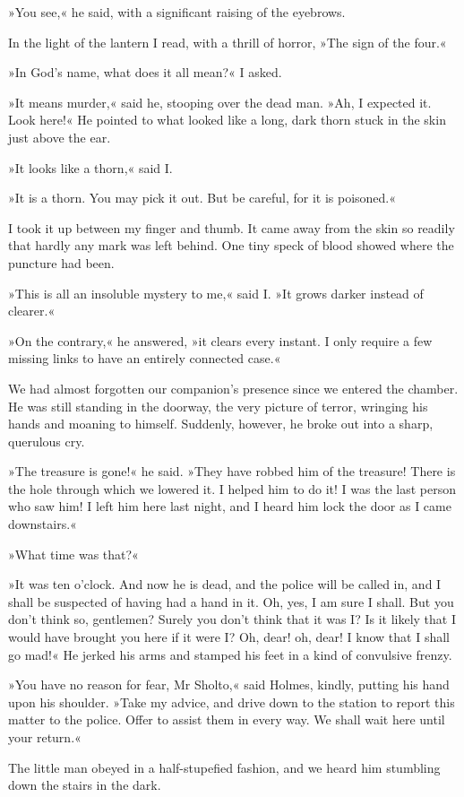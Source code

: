 »You see,« he said, with a significant raising of the eyebrows.

In the light of the lantern I read, with a thrill of horror, »The sign of the four.«

»In God's name, what does it all mean?« I asked.

»It means murder,« said he, stooping over the dead man. »Ah, I expected it. Look here!« He pointed to what looked like a long, dark thorn stuck in the skin just above the ear.

»It looks like a thorn,« said I.

»It is a thorn. You may pick it out. But be careful, for it is poisoned.«

I took it up between my finger and thumb. It came away from the skin so readily that hardly any mark was left behind. One tiny speck of blood showed where the puncture had been.

»This is all an insoluble mystery to me,« said I. »It grows darker instead of clearer.«

»On the contrary,« he answered, »it clears every instant. I only require a few missing links to have an entirely connected case.«

We had almost forgotten our companion's presence since we entered the chamber. He was still standing in the doorway, the very picture of terror, wringing his hands and moaning to himself. Suddenly, however, he broke out into a sharp, querulous cry.

»The treasure is gone!« he said. »They have robbed him of the treasure! There is the hole through which we lowered it. I helped him to do it! I was the last person who saw him! I left him here last night, and I heard him lock the door as I came downstairs.«

»What time was that?«

»It was ten o'clock. And now he is dead, and the police will be called in, and I shall be suspected of having had a hand in it. Oh, yes, I am sure I shall. But you don't think so, gentlemen? Surely you don't think that it was I? Is it likely that I would have brought you here if it were I? Oh, dear! oh, dear! I know that I shall go mad!« He jerked his arms and stamped his feet in a kind of convulsive frenzy.

»You have no reason for fear, Mr Sholto,« said Holmes, kindly, putting his hand upon his shoulder. »Take my advice, and drive down to the station to report this matter to the police. Offer to assist them in every way. We shall wait here until your return.«

The little man obeyed in a half-stupefied fashion, and we heard him stumbling down the stairs in the dark.